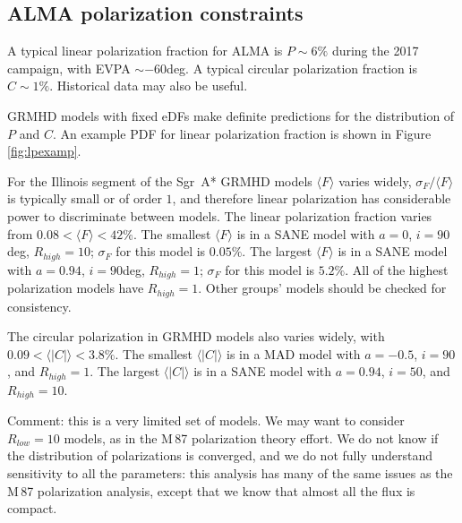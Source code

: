 \documentclass[twocolumn,tighten,dvipsnames]{aastex63}
\newcommand\sgra{Sgr~A*\xspace}
\def\M87{M\,87\xspace}
\newcommand\<{{\langle}}
\renewcommand\>{{\rangle}} %
\begin{document}
\subsection{ALMA polarization constraints}
\label{sec:polconst}

A typical linear polarization fraction for ALMA is $P \sim 6\%$ during the 2017 campaign, with EVPA $\sim -60$deg.  A typical circular polarization fraction is $C \sim 1\%$.  Historical data may also be useful.

GRMHD models with fixed eDFs make definite predictions for the distribution of $P$ and $C$.  An example PDF for linear polarization fraction is shown in Figure \ref{fig:lpexamp}.

\begin{figure*}
  \caption{Left: distribution of linear polarization fraction from a MAD model with $a = 0$, $i = 30$deg, $R_{high} = 10$. Right: distribution of circular polarization fraction for the same model.}
  \label{fig:lpexamp}
\end{figure*}

For the Illinois segment of the \sgra GRMHD models $\< F\>$ varies widely, $\sigma_F/\<F\>$ is typically small or of order $1$, and therefore linear polarization has considerable power to discriminate between models.  The linear polarization fraction varies from $0.08 < \<F\> < 42 \%$.  The smallest $\<F\>$ is in a SANE model with $a = 0$, $i = 90$deg, $R_{high} = 10$; $\sigma_F$ for this model is $0.05\%$. The largest $\<F\>$ is in a SANE model with $a = 0.94$, $i = 90$deg, $R_{high} = 1$; $\sigma_F$ for this model is $5.2\%$.  All of the highest polarization models have $R_{high} = 1$.  Other groups' models should be checked for consistency.

The circular polarization in GRMHD models also varies widely, with  $0.09 < \<|C|\> < 3.8 \%$.  The smallest $\<|C|\>$ is in a MAD model with $a = -0.5$, $i = 90$, and $R_{high} = 1$.  The largest $\<|C|\>$ is in a SANE model with $a = 0.94$, $i = 50$, and $R_{high} = 10$.

Comment: this is a very limited set of models.  We may want to consider $R_{low} = 10$ models, as in the \M87 polarization theory effort.   We do not know if the distribution of polarizations is converged, and we do not fully understand sensitivity to all the parameters: this analysis has many of the same issues as the \M87 polarization analysis, except that we know that almost all the flux is compact.
\end{document}
